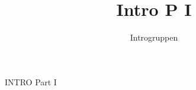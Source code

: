 \documentclass[a4paper]{article}
\title{Intro P I}
\author{Introgruppen}
\begin{document}
\maketitle

\begin{sketch}

\begin{center}\begin{Huge}
\vspace{7cm}
  INTRO Part I
\end{Huge}\end{center}

\end{sketch}
\end{document}
